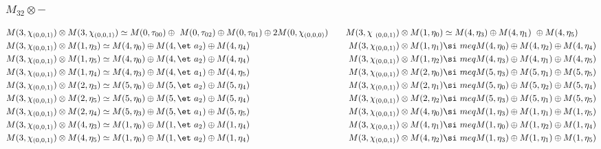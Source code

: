 \subsubsection{$M_32\otimes -$}
\begin{align*}
M(3,\chi_{(0,0,1)}) &\otimes M(3,\chi_{(0,0,1)}) \simeq M(0,\tau_{00}) \oplus \
M(0,\tau_{02}) \oplus M(0,\tau_{01}) \oplus 2 M(0,\chi_{(0,0,0)}) &&& M(3,\chi\
_{(0,0,1)}) &\otimes M(1,\eta_{0}) \simeq M(4,\eta_{3}) \oplus M(4,\eta_{1}) \
\oplus M(4,\eta_{5})\\
M(3,\chi_{(0,0,1)}) &\otimes M(1,\eta_{3}) \simeq M(4,\eta_{0}) \oplus M(4,\et\
a_{2}) \oplus M(4,\eta_{4}) &&& M(3,\chi_{(0,0,1)}) &\otimes M(1,\eta_{1}) \si\
meq M(4,\eta_{0}) \oplus M(4,\eta_{2}) \oplus M(4,\eta_{4})\\
M(3,\chi_{(0,0,1)}) &\otimes M(1,\eta_{5}) \simeq M(4,\eta_{0}) \oplus M(4,\et\
a_{2}) \oplus M(4,\eta_{4}) &&& M(3,\chi_{(0,0,1)}) &\otimes M(1,\eta_{2}) \si\
meq M(4,\eta_{3}) \oplus M(4,\eta_{1}) \oplus M(4,\eta_{5})\\
M(3,\chi_{(0,0,1)}) &\otimes M(1,\eta_{4}) \simeq M(4,\eta_{3}) \oplus M(4,\et\
a_{1}) \oplus M(4,\eta_{5}) &&& M(3,\chi_{(0,0,1)}) &\otimes M(2,\eta_{0}) \si\
meq M(5,\eta_{3}) \oplus M(5,\eta_{1}) \oplus M(5,\eta_{5})\\
M(3,\chi_{(0,0,1)}) &\otimes M(2,\eta_{3}) \simeq M(5,\eta_{0}) \oplus M(5,\et\
a_{2}) \oplus M(5,\eta_{4}) &&& M(3,\chi_{(0,0,1)}) &\otimes M(2,\eta_{1}) \si\
meq M(5,\eta_{0}) \oplus M(5,\eta_{2}) \oplus M(5,\eta_{4})\\
M(3,\chi_{(0,0,1)}) &\otimes M(2,\eta_{5}) \simeq M(5,\eta_{0}) \oplus M(5,\et\
a_{2}) \oplus M(5,\eta_{4}) &&& M(3,\chi_{(0,0,1)}) &\otimes M(2,\eta_{2}) \si\
meq M(5,\eta_{3}) \oplus M(5,\eta_{1}) \oplus M(5,\eta_{5})\\
M(3,\chi_{(0,0,1)}) &\otimes M(2,\eta_{4}) \simeq M(5,\eta_{3}) \oplus M(5,\et\
a_{1}) \oplus M(5,\eta_{5}) &&& M(3,\chi_{(0,0,1)}) &\otimes M(4,\eta_{0}) \si\
meq M(1,\eta_{3}) \oplus M(1,\eta_{1}) \oplus M(1,\eta_{5})\\
M(3,\chi_{(0,0,1)}) &\otimes M(4,\eta_{3}) \simeq M(1,\eta_{0}) \oplus M(1,\et\
a_{2}) \oplus M(1,\eta_{4}) &&& M(3,\chi_{(0,0,1)}) &\otimes M(4,\eta_{1}) \si\
meq M(1,\eta_{0}) \oplus M(1,\eta_{2}) \oplus M(1,\eta_{4})\\
M(3,\chi_{(0,0,1)}) &\otimes M(4,\eta_{5}) \simeq M(1,\eta_{0}) \oplus M(1,\et\
a_{2}) \oplus M(1,\eta_{4}) &&& M(3,\chi_{(0,0,1)}) &\otimes M(4,\eta_{2}) \si\
meq M(1,\eta_{3}) \oplus M(1,\eta_{1}) \oplus M(1,\eta_{5})\\

\end{align*}
